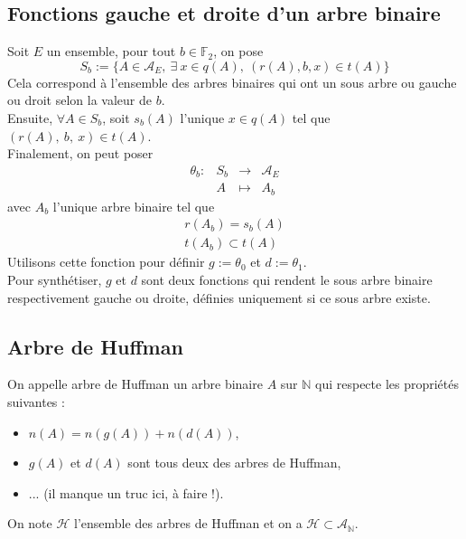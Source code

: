 \documentclass[a4paper, 12pt]{article}
\begin{document}
\subsection{Fonctions gauche et droite d'un arbre binaire}
Soit $E$ un ensemble, pour tout $b \in \mathbb{F}_2$, on pose
$$
S_b := \{A \in \mathcal{A}_E,\ \exists \ x \in q(A),\ (r(A), b, x) \in t(A)\}
$$
Cela correspond à l'ensemble des arbres binaires qui ont un sous arbre ou gauche ou droit selon la valeur de $b$. \\
Ensuite, $\forall A \in S_b$, soit $s_b(A)$ l'unique $x \in q(A)$ tel que $(r(A),\ b,\ x) \in t(A)$. \\
Finalement, on peut poser
$$
\begin{matrix}
\theta_b: &S_b &\rightarrow &\mathcal{A}_E \\
&A &\mapsto &A_b
\end{matrix}
$$
avec $A_b$ l'unique arbre binaire tel que
\begin{gather}
r(A_b) = s_b(A) \\
t(A_b) \subset t(A)
\end{gather}
Utilisons cette fonction pour définir $g := \theta_0$ et $d := \theta_1$. \\
Pour synthétiser, $g$ et $d$ sont deux fonctions qui rendent le sous arbre binaire respectivement gauche ou droite, définies uniquement si ce sous arbre existe. \\

\subsection{Arbre de Huffman}
On appelle arbre de Huffman un arbre binaire $A$ sur $\mathbb{N}$ qui respecte les propriétés suivantes :
\begin{itemize}
\item $n(A) = n(g(A))+n(d(A))$,
\item $g(A)$ et $d(A)$ sont tous deux des arbres de Huffman,
\item ... (il manque un truc ici, à faire !).
\end{itemize}
On note $\mathcal{H}$ l'ensemble des arbres de Huffman et on a $\mathcal{H} \subset \mathcal{A}_\mathbb{N}$.
\end{document}
